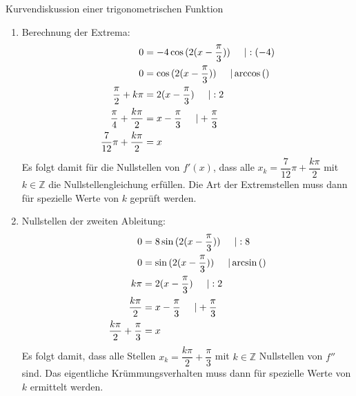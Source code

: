 \begin{bsp}{Kurvendiskussion einer trigonometrischen Funktion}{}
\begin{enumerate}
\begin{equation*}
\begin{split}
                    f''(x) &= 4\sin{(2(x-\frac{\pi}{3}))}\cdot 2\\
                    &= 8\sin{(2(x-\frac{\pi}{3}))} 
                \end{split}
            \end{equation*}
            \item Berechnung der Extrema:
            \begin{equation*}
                \begin{split}
                    0&= -4\cos{(2(x-\frac{\pi}{3}))} \hspace{0.5cm} | :(-4)\\
                    0&= \cos{(2(x-\frac{\pi}{3}))}\hspace{0.5cm} | \arccos{()}\\
                    \dfrac{\pi}{2} + k\pi &= 2(x-\frac{\pi}{3}) \hspace{0.5cm} |:2\\
                    \dfrac{\pi}{4} +\dfrac{k\pi}{2} &=x-\frac{\pi}{3} \hspace{0.5cm}| +\frac{\pi}{3}\\
                    \dfrac{7}{12}\pi + \dfrac{k\pi}{2} &= x
                \end{split}
            \end{equation*}
             Es folgt damit für die Nullstellen von $f'(x)$, dass alle $x_k=\dfrac{7}{12} \pi +\dfrac{k\pi}{2}$ mit $k\in \mathds{Z}$ die Nullstellengleichung erfüllen.
Die Art der Extremstellen muss dann für spezielle Werte von $k$ geprüft werden.
\item Nullstellen der zweiten Ableitung:
\begin{equation*}
    \begin{split}
        0&= 8\sin{(2(x-\frac{\pi}{3}))}\hspace{0.5cm} | :8\\
        0&= \sin{(2(x-\frac{\pi}{3}))}\hspace{0.5cm} | \arcsin{()}\\
        k\pi&= 2(x-\frac{\pi}{3}) \hspace{0.5cm} | :2\\
        \dfrac{k\pi}{2} &= x-\frac{\pi}{3} \hspace{0.5cm} |+\frac{\pi}{3}\\
        \dfrac{k\pi}{2} +\frac{\pi}{3} &= x
    \end{split}
\end{equation*}
             Es folgt damit, dass alle Stellen $x_k= \dfrac{k\pi}{2} +\dfrac{\pi}{3}$ mit $k\in \mathds{Z}$ Nullstellen von $f''$ sind.
Das eigentliche Krümmungsverhalten muss dann für spezielle Werte von $k$ ermittelt werden.


\end{enumerate}
\end{bsp}
